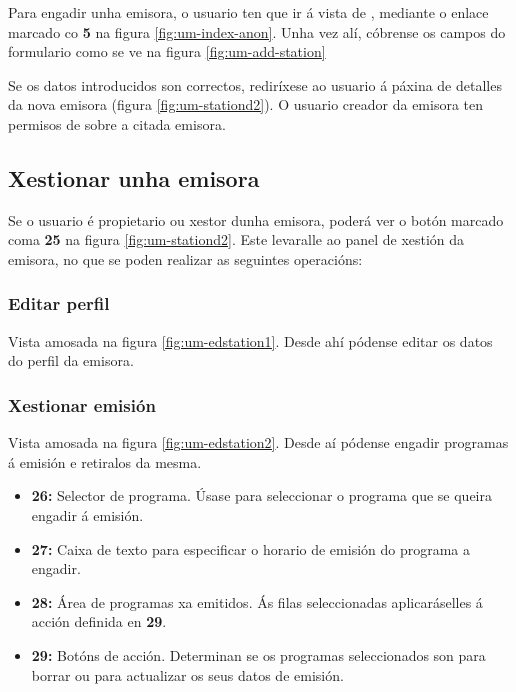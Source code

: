 Para engadir unha emisora, o usuario ten que ir á vista de , mediante o enlace marcado co \textbf{5} na figura 	\ref{fig:um-index-anon}. Unha vez alí, cóbrense os campos do formulario como se ve na figura \ref{fig:um-add-station}

Se os datos introducidos son correctos, rediríxese ao usuario á páxina de detalles da nova emisora (figura \ref{fig:um-stationd2}). O usuario creador da emisora ten permisos de  sobre a citada emisora.


\subsection{Xestionar unha emisora}

Se o usuario é propietario ou xestor dunha emisora, poderá ver o botón marcado coma \textbf{25} na figura \ref{fig:um-stationd2}. Este levaralle ao panel de xestión da emisora, no que se poden realizar as seguintes operacións:

\subsubsection{Editar perfil}

Vista amosada na figura \ref{fig:um-edstation1}. Desde ahí pódense editar os datos do perfil da emisora.


\subsubsection{Xestionar emisión}
\label{xe}

Vista amosada na figura \ref{fig:um-edstation2}. Desde aí pódense engadir programas á emisión e retiralos da mesma.

\begin{itemize}
	\item \textbf{26:} Selector de programa. Úsase para seleccionar o programa que se queira engadir á emisión.
	\item \textbf{27:} Caixa de texto para especificar o horario de emisión do programa a engadir.
	\item \textbf{28:} Área de programas xa emitidos. Ás filas seleccionadas aplicaráselles á acción definida en \textbf{29}.
	\item \textbf{29:} Botóns de acción. Determinan se os programas seleccionados son para borrar ou para actualizar os seus datos de emisión.
\end{itemize}

